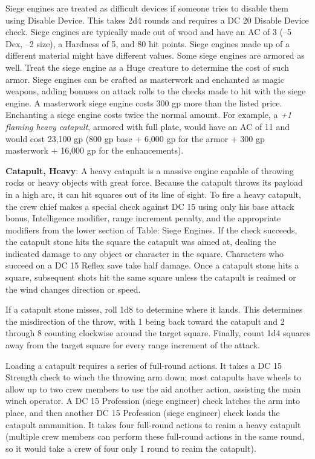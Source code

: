 				
Siege engines are treated as difficult devices if someone tries to disable them using Disable Device. This takes 2d4 rounds and requires a DC 20 Disable Device check. Siege engines are typically made out of wood and have an AC of 3 (--5 Dex, --2 size), a Hardness of 5, and 80 hit points. Siege engines made up of a different material might have different values. Some siege engines are armored as well. Treat the siege engine as a Huge creature to determine the cost of such armor. Siege engines can be crafted as masterwork and enchanted as magic weapons, adding bonuses on attack rolls to the checks made to hit with the siege engine. A masterwork siege engine costs 300 gp more than the listed price. Enchanting a siege engine costs twice the normal amount. For example, a \textit{+1 flaming heavy catapult}, armored with full plate, would have an AC of 11 and would cost 23,100 gp (800 gp base + 6,000 gp for the armor + 300 gp masterwork + 16,000 gp for the enhancements).
				
\textbf{Catapult, Heavy}: A heavy catapult is a massive engine capable of throwing rocks or heavy objects with great force. Because the catapult throws its payload in a high arc, it can hit squares out of its line of sight. To fire a heavy catapult, the crew chief makes a special check against DC 15 using only his base attack bonus, Intelligence modifier, range increment penalty, and the appropriate modifiers from the lower section of Table: Siege Engines. If the check succeeds, the catapult stone hits the square the catapult was aimed at, dealing the indicated damage to any object or character in the square. Characters who succeed on a DC 15 Reflex save take half damage. Once a catapult stone hits a square, subsequent shots hit the same square unless the catapult is reaimed or the wind changes direction or speed.
				
If a catapult stone misses, roll 1d8 to determine where it lands. This determines the misdirection of the throw, with 1 being back toward the catapult and 2 through 8 counting clockwise around the target square. Finally, count 1d4 squares away from the target square for every range increment of the attack.
				
Loading a catapult requires a series of full-round actions. It takes a DC 15 Strength check to winch the throwing arm down; most catapults have wheels to allow up to two crew members to use the aid another action, assisting the main winch operator. A DC 15 Profession (siege engineer) check latches the arm into place, and then another DC 15 Profession (siege engineer) check loads the catapult ammunition. It takes four full-round actions to reaim a heavy catapult (multiple crew members can perform these full-round actions in the same round, so it would take a crew of four only 1 round to reaim the catapult).
				
